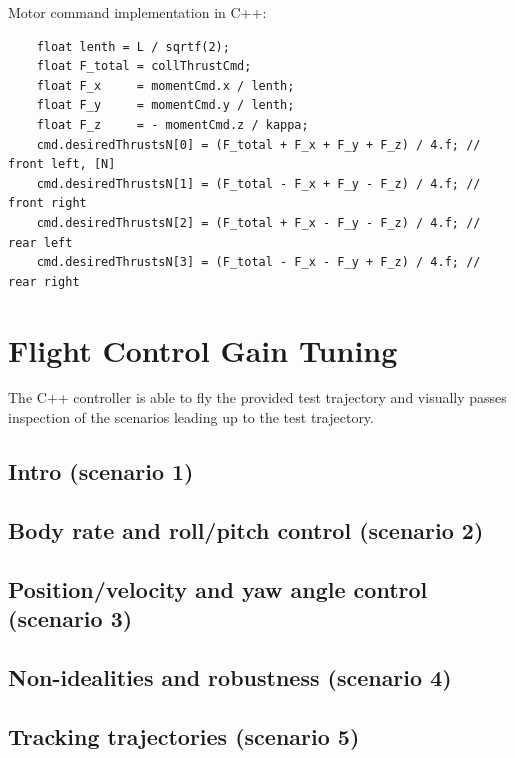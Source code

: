 \documentclass[a4paper]{article}
\begin{document}
Motor command implementation in C++:
\begin{lstlisting}
    float lenth = L / sqrtf(2);
    float F_total = collThrustCmd;
    float F_x     = momentCmd.x / lenth;
    float F_y     = momentCmd.y / lenth;
    float F_z     = - momentCmd.z / kappa;
    cmd.desiredThrustsN[0] = (F_total + F_x + F_y + F_z) / 4.f; // front left, [N]
    cmd.desiredThrustsN[1] = (F_total - F_x + F_y - F_z) / 4.f; // front right
    cmd.desiredThrustsN[2] = (F_total + F_x - F_y - F_z) / 4.f; // rear left
    cmd.desiredThrustsN[3] = (F_total - F_x - F_y + F_z) / 4.f; // rear right
\end{lstlisting}

\section{Flight Control Gain Tuning}

The C++ controller is able to fly the provided test trajectory and visually passes inspection of the scenarios leading up to the test trajectory.

\subsection{Intro (scenario 1)}

\subsection{Body rate and roll/pitch control (scenario 2)}

\subsection{Position/velocity and yaw angle control (scenario 3)}

\subsection{Non-idealities and robustness (scenario 4)}

\subsection{Tracking trajectories (scenario 5)}
\end{document}
